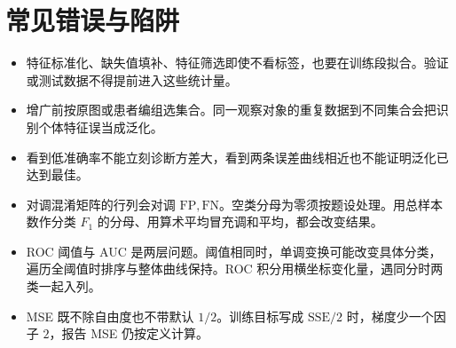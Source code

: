 \documentclass[UTF8,a4paper,zihao=-4,fontset=fandol]{ctexrep}
\begin{document}
\section{常见错误与陷阱}
\begin{itemize}[leftmargin=2em]
\item 特征标准化、缺失值填补、特征筛选即使不看标签，也要在训练段拟合。验证或测试数据不得提前进入这些统计量。
\item 增广前按原图或患者编组选集合。同一观察对象的重复数据到不同集合会把识别个体特征误当成泛化。
\item 看到低准确率不能立刻诊断方差大，看到两条误差曲线相近也不能证明泛化已达到最佳。
\item 对调混淆矩阵的行列会对调 \(\mathrm{FP},\mathrm{FN}\)。空类分母为零须按题设处理。用总样本数作分类 \(F_1\) 的分母、用算术平均冒充调和平均，都会改变结果。
\item ROC 阈值与 AUC 是两层问题。阈值相同时，单调变换可能改变具体分类，遍历全阈值时排序与整体曲线保持。ROC 积分用横坐标变化量，遇同分时两类一起入列。
\item MSE 既不除自由度也不带默认 \(1/2\)。训练目标写成 \(\mathrm{SSE}/2\) 时，梯度少一个因子 \(2\)，报告 MSE 仍按定义计算。
\end{itemize}
\end{document}
